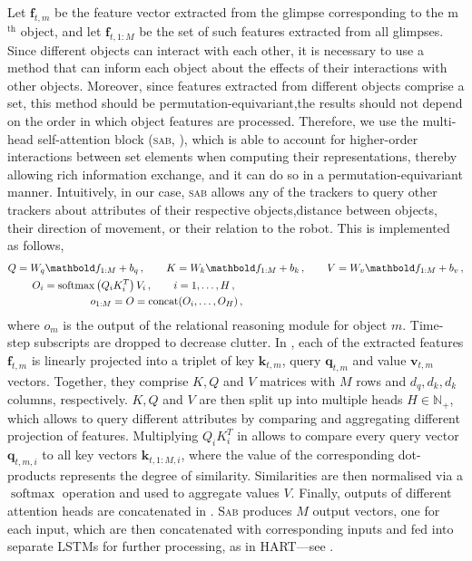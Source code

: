 Let $\mathbf{f}_{t, m}$ be the feature vector extracted from the glimpse corresponding to the m$^\mathrm{th}$ object, and let $\mathbf{f}_{t, 1:M}$ be the set of such features extracted from all glimpses.
Since different objects can interact with each other, it is necessary to use a method that can inform each object about the effects of their interactions with other objects.
Moreover, since features extracted from different objects comprise a set, this method should be permutation-equivariant,\ie the results should not depend on the order in which object features are processed.
Therefore, we use the multi-head self-attention block (\textsc{sab}, \citet{Lee2019set}), which is able to account for higher-order interactions between set elements when computing their representations, thereby allowing rich information exchange, and it can do so in a permutation-equivariant manner.
Intuitively, in our case, \textsc{sab} allows any of the trackers to query other trackers about attributes of their respective objects,\eg distance between objects, their direction of movement, or their relation to the robot.
This is implemented as follows,
\begin{align}
Q &= W_q \mathbf{f}_{1:M} + b_q\,, \qquad K = W_k \mathbf{f}_{1:M} + b_k\,, \qquad V = W_v \mathbf{f}_{1:M} + b_v \label{eq:projection}\,,\\
&\hspace{1.5em} O_i = \operatorname{softmax}\left( Q_i K_i^T \right) V_i\,, \qquad i=1,\dots,H\,, \label{eq:att}\\
&\hspace{7em} o_{1:M} = O = \operatorname{concat}(O_i,\dots,O_H)\,, \label{eq:multihead}
\end{align}
where $o_m$ is the output of the relational reasoning module for object $m$. Time-step subscripts are dropped to decrease clutter.
In , each of the extracted features $\mathbf{f}_{t,m}$ is linearly projected into a triplet of key $\mathbf{k}_{t,m}$, query $\mathbf{q}_{t,m}$ and value $\mathbf{v}_{t,m}$ vectors. Together, they comprise $K, Q$ and $V$ matrices with $M$ rows and $d_q, d_k, d_k$ columns, respectively.
$K, Q$ and $V$ are then split up into multiple heads $H \in \mathbb{N}_+$, which allows to query different attributes by comparing and aggregating different projection of features.
Multiplying $Q_iK_i^T$ in  allows to compare every query vector $\mathbf{q}_{t,m,i}$ to all key vectors $\mathbf{k}_{t,1:M,i}$, where the value of the corresponding dot-products represents the degree of similarity.
Similarities are then normalised via a $\operatorname{softmax}$ operation and used to aggregate values $V$.
Finally, outputs of different attention heads are concatenated in .
\textsc{Sab} produces $M$ output vectors, one for each input, which are then concatenated with corresponding inputs and fed into separate \gls{LSTM}s for further processing, as in \gls{HART}---see .

